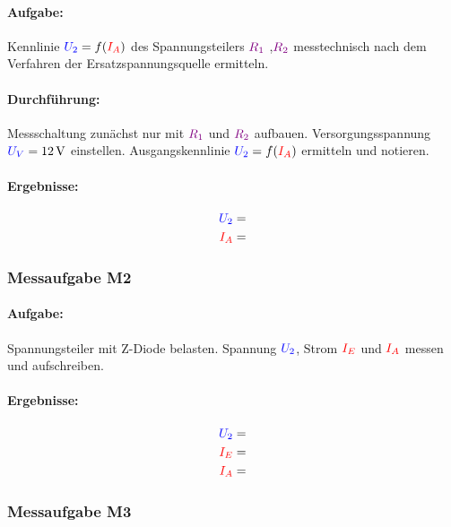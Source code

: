 \documentclass[11pt,a4paper,titlepage,parskip=half]{scrreprt}
\begin{document}
                  \paragraph{Aufgabe:} Kennlinie $\textcolor{blue}{U_2}= f(\textcolor{red}{I_A})$ des Spannungsteilers $\textcolor{violet}{R_1}$ ,$\textcolor{violet}{R_2}$ messtechnisch nach dem Verfahren der Ersatzspannungsquelle ermitteln.
                  \paragraph{Durchführung:} Messschaltung zunächst nur mit $\textcolor{violet}{R_1}$ und $\textcolor{violet}{R_2}$ aufbauen. Versorgungsspannung
                  $\textcolor{blue}{U_V} = \SI{12}{\volt}$ einstellen. Ausgangskennlinie $\textcolor{blue}{U_2}= f(\textcolor{red}{I_A})$ ermitteln und notieren.

                  \paragraph{Ergebnisse:}
                  \begin{align*}
                      \textcolor{blue}{U_2} &= \\
                      \textcolor{red}{I_A} &= 
                  \end{align*}
        
              \subsubsection{Messaufgabe M2}
                  \paragraph{Aufgabe:}Spannungsteiler mit Z-Diode belasten. Spannung $\textcolor{blue}{U_2}$, Strom $\textcolor{red}{I_E}$ und $\textcolor{red}{I_A}$ messen und aufschreiben.
                  \paragraph{Ergebnisse:}
                  \begin{align*}
                      \textcolor{blue}{U_2} &= \\
                          \textcolor{red}{I_E} &= \\
                          \textcolor{red}{I_A} &= 
                  \end{align*}

            \subsubsection{Messaufgabe M3}
\end{document}
